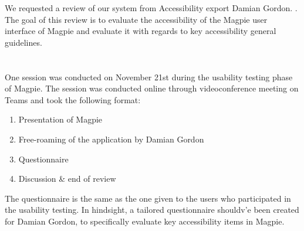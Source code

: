 We requested a review of our system from Accessibility export Damian Gordon. .\\
The goal of this review is to evaluate the accessibility of the Magpie user interface of Magpie and evaluate it with regards to key accessibility general guidelines.\\
 \\ \\
One session was conducted on November 21st during the usability testing phase of Magpie. The session was conducted online through videoconference meeting on Teams and took the following format:
\begin{enumerate}
    \item Presentation of Magpie
    \item Free-roaming of the application by Damian Gordon
    \item Questionnaire
    \item Discussion \& end of review
\end{enumerate}
The questionnaire is the same as the one given to the users who participated in the usability testing. In hindsight, a tailored questionnaire shouldv'e been created for Damian Gordon, to specifically evaluate key accessibility items in Magpie.
